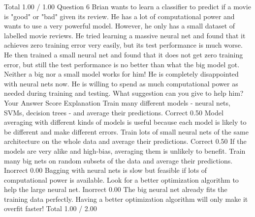 Total		1.00 / 1.00	
Question 6
Brian wants to learn a classifier to predict if a movie is "good" or "bad" given its review. He has a lot of computational power and wants to use a very powerful model. However, he only has a small dataset of labelled movie reviews. He tried learning a massive neural net and found that it achieves zero training error very easily, but its test performance is much worse. He then trained a small neural net and found that it does not get zero training error, but still the test performance is no better than what the big model got. Neither a big nor a small model works for him! He is completely disappointed with neural nets now. He is willing to spend as much computational power as needed during training and testing. What suggestion can you give to help him?
Your Answer		Score	Explanation
Train many different models - neural nets, SVMs, decision trees - and average their predictions.	Correct	0.50	Model averaging with different kinds of models is useful because each model is likely to be different and make different errors.
Train lots of small neural nets of the same architecture on the whole data and average their predictions.	Correct	0.50	If the models are very alike and high-bias, averaging them is unlikely to benefit.
Train many big nets on random subsets of the data and average their predictions.	Inorrect	0.00	Bagging with neural nets is slow but feasible if lots of computational power is available.
Look for a better optimization algorithm to help the large neural net.	Inorrect	0.00	The big neural net already fits the training data perfectly. Having a better optimization algorithm will only make it overfit faster!
Total		1.00 / 2.00	
